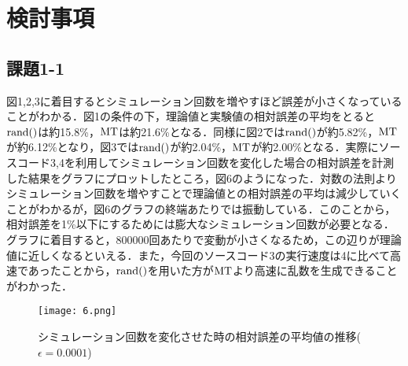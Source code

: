 \documentclass[12pt]{jarticle}
\begin{document}
\section{検討事項}
\subsection{課題1-1}
\begin{shadebox}
\end{shadebox}
\vspace{\baselineskip}
図1,2,3に着目するとシミュレーション回数を増やすほど誤差が小さくなっていることがわかる．図1の条件の下，理論値と実験値の相対誤差の平均をとると$\rm{rand()}$は約15.8\%，$\rm{MT}$は約21.6\%となる．同様に図2では$\rm{rand()}$が約5.82\%，$\rm{MT}$が約6.12\%となり，図3では$\rm{rand()}$が約2.04\%，$\rm{MT}$が約2.00\%となる．実際にソースコード3,4を利用してシミュレーション回数を変化した場合の相対誤差を計測した結果をグラフにプロットしたところ，図6のようになった．対数の法則よりシミュレーション回数を増やすことで理論値との相対誤差の平均は減少していくことがわかるが，図6のグラフの終端あたりでは振動している．このことから，相対誤差を1\%以下にするためには膨大なシミュレーション回数が必要となる．グラフに着目すると，800000回あたりで変動が小さくなるため，この辺りが理論値に近しくなるといえる．また，今回のソースコード3の実行速度は4に比べて高速であったことから，$\rm{rand()}$を用いた方が$\rm{MT}$より高速に乱数を生成できることがわかった．
\begin{figure}[H]
    \begin{center}
        \texttt{[image: 6.png]}
    \end{center}
    \caption{シミュレーション回数を変化させた時の相対誤差の平均値の推移($\epsilon=0.0001$)}
    \label{fig1}
\end{figure}
\end{document}
